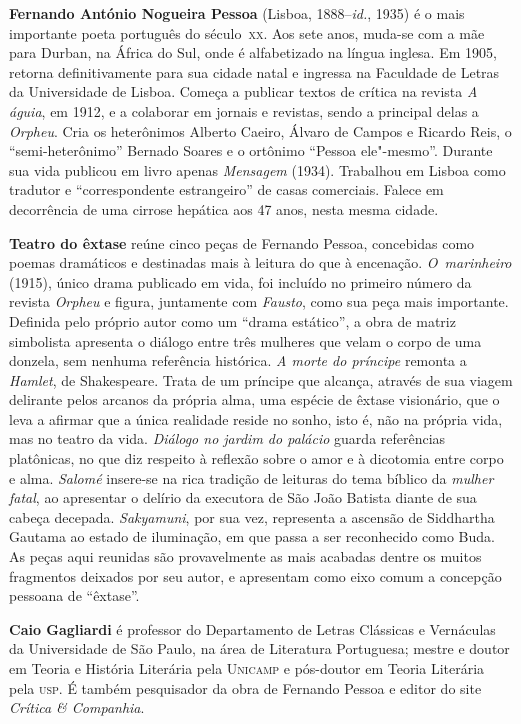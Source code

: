 \textbf{Fernando António Nogueira Pessoa} (Lisboa, 1888--\textit{id.}, 1935) é o mais
importante poeta português do século~\textsc{xx}. Aos sete anos, muda-se com a mãe para Durban,
na África do Sul, onde é alfabetizado na língua inglesa.
Em 1905, retorna definitivamente para sua cidade natal e ingressa na Faculdade de Letras
da Universidade de Lisboa. Começa a publicar textos de crítica na revista
\textit{A águia}, em 1912, e a colaborar em jornais e revistas, sendo a principal delas a 
\textit{Orpheu}. Cria os heterônimos Alberto Caeiro, Álvaro
de Campos e Ricardo Reis, o ``semi-heterônimo'' Bernado Soares e o ortônimo
``Pessoa ele"-mesmo''. Durante sua vida publicou em livro apenas \textit{Mensagem} (1934). 
Trabalhou em Lisboa como tradutor e ``correspondente estrangeiro'' de casas comerciais. 
Falece em decorrência de uma cirrose hepática aos 47 anos, nesta mesma cidade. 

\textbf{Teatro do êxtase} reúne cinco peças de Fernando Pessoa, concebidas 
como poemas dramáticos e destinadas mais à leitura do que à encenação. 
\textit{O~marinheiro} (1915), único drama publicado em vida, foi incluído no
primeiro número da revista \textit{Orpheu} e figura, juntamente com
\textit{Fausto}, como sua peça mais importante.  Definida pelo próprio autor
como um ``drama estático'', a obra de matriz simbolista apresenta o diálogo
entre três mulheres que velam o corpo de uma donzela, sem nenhuma referência
histórica. 
%
\textit{A morte do príncipe} remonta a \textit{Hamlet}, de Shakespeare. 
Trata de um príncipe que
alcança, através de sua viagem delirante pelos arcanos da própria alma,
uma espécie de êxtase visionário, que o leva a afirmar que a única
realidade reside no sonho, isto é, não na própria vida, mas no teatro
da vida. 
%
\textit{Diálogo no jardim do palácio} guarda referências platônicas,
no que diz respeito à reflexão sobre o amor e à dicotomia
entre corpo e alma.
%
\textit{Salomé} insere-se na rica tradição de leituras do
tema bíblico da \textit{mulher fatal}, ao apresentar o delírio 
da executora de São João Batista diante de sua cabeça decepada. 
%
\textit{Sakyamuni}, por sua vez, representa a ascensão de Siddhartha Gautama ao estado de
iluminação, em que passa a ser reconhecido como Buda. 
%
As peças aqui reunidas são provavelmente as mais acabadas
dentre os muitos fragmentos deixados por seu autor, e apresentam
como eixo comum a concepção pessoana de ``êxtase''.


\textbf{Caio Gagliardi} é professor do Departamento de Letras Clássicas e
Vernáculas da Universidade de São Paulo, na área de Literatura
Portuguesa; mestre e doutor em Teoria e História Literária pela \textsc{Unicamp}
e pós-doutor em Teoria Literária pela \textsc{usp}. É também pesquisador da obra
de Fernando Pessoa e editor do site \textit{Crítica \& Companhia}.




